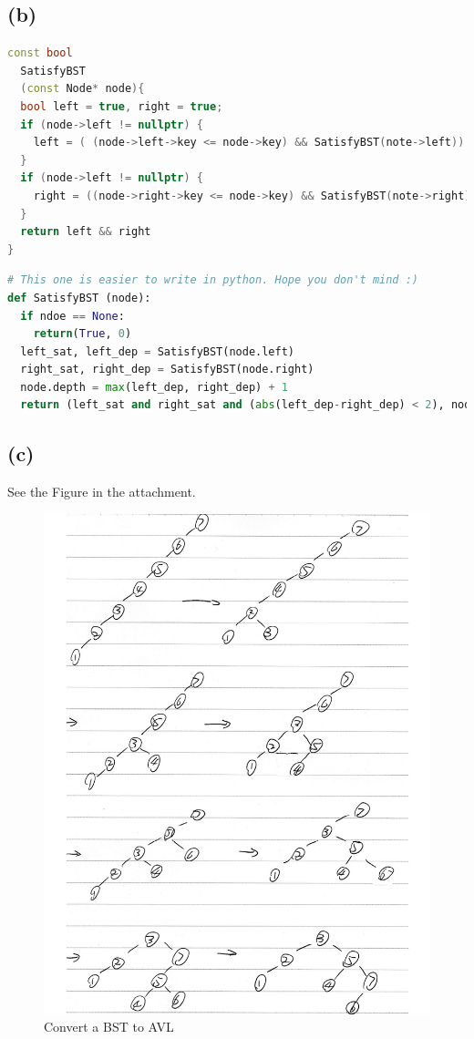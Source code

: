 \documentclass{article}
\begin{document}
  \subsection*{(b)}
\begin{lstlisting}[language = C++]
const bool
  SatisfyBST 
  (const Node* node){
  bool left = true, right = true;
  if (node->left != nullptr) {
    left = ( (node->left->key <= node->key) && SatisfyBST(note->left))
  } 
  if (node->left != nullptr) {
    right = ((node->right->key <= node->key) && SatisfyBST(note->right))
  } 
  return left && right
}
\end{lstlisting}   
\begin{lstlisting}[language = python]
# This one is easier to write in python. Hope you don't mind :)
def SatisfyBST (node):
  if ndoe == None:
    return(True, 0)
  left_sat, left_dep = SatisfyBST(node.left)
  right_sat, right_dep = SatisfyBST(node.right)
  node.depth = max(left_dep, right_dep) + 1
  return (left_sat and right_sat and (abs(left_dep-right_dep) < 2), node.depth)

\end{lstlisting}   
  
  \subsection*{(c)}
  See the Figure in the attachment.
  \begin{figure}[h]
    \includegraphics[width=\textwidth]{Pic/BST2AVL.pdf}
    \caption{Convert a BST to AVL}
  \end{figure}
\end{document}
